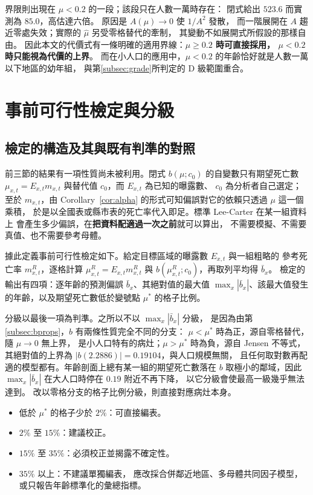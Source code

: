 \documentclass[UTF8, fontset=macnew, a4paper, 12pt]{ctexart}
\begin{document}
界限則出現在 $\mu<0.2$ 的一段；該段只在人數一萬時存在：
閉式給出 $523.6$ 而實測為 $85.0$，高估達六倍。
原因是 $A(\mu)\to0$ 使 $1/A^2$ 發散，
而一階展開在 $A$ 趨近零處失效；實際的 $\hat\mu$ 另受零格替代的牽制，
其變動不如展開式所假設的那樣自由。
因此本文的代價式有一條明確的適用界線：\textbf{$\mu\ge0.2$ 時可直接採用，
$\mu<0.2$ 時只能視為代價的上界}。
而在小人口的應用中，$\mu<0.2$ 的年齡恰好就是人數一萬以下地區的幼年組，
與第\ref{subsec:grade}所判定的 D 級範圍重合。

\section{事前可行性檢定與分級}\label{sec:feas}

\subsection{檢定的構造及其與既有判準的對照}\label{subsec:feasconstr}\label{subsec:cred2}

前三節的結果有一項性質尚未被利用。閉式 $b(\mu;c_0)$ 的自變數只有期望死亡數
$\mu_{x,t}=E_{x,t}m_{x,t}$ 與替代值 $c_0$，而 $E_{x,t}$ 為已知的曝露數、
$c_0$ 為分析者自己選定；至於 $m_{x,t}$，由 Corollary~\ref{cor:alpha}
的形式可知偏誤對它的依賴只透過 $\mu$ 這一個乘積，
於是以全國表或縣市表的死亡率代入即足。標準 Lee-Carter 在某一組資料上
會產生多少偏誤，在\textbf{把資料配適過一次之前}就可以算出，
不需要模擬、不需要真值、也不需要參考母體。

據此定義事前可行性檢定如下。給定目標區域的曝露數 $E_{x,t}$ 與一組粗略的
參考死亡率 $m^{R}_{x,t}$，逐格計算 $\mu^{R}_{x,t}=E_{x,t}m^{R}_{x,t}$ 與
$b(\mu^{R}_{x,t};c_0)$，再取列平均得 $\bar b_x$。
檢定的輸出有四項：逐年齡的預測偏誤 $\bar b_x$、其絕對值的最大值
$\max_x|\bar b_x|$、該最大值發生的年齡，以及期望死亡數低於變號點
$\mu^{\ast}$ 的格子比例。

分級以最後一項為判準。之所以不以 $\max_x|\bar b_x|$ 分級，
是因為由第\ref{subsec:bprops}，$b$ 有兩條性質完全不同的分支：
$\mu<\mu^{\ast}$ 時為正，源自零格替代，隨 $\mu\to0$ 無上界，
是小人口特有的病灶；$\mu>\mu^{\ast}$ 時為負，源自 Jensen 不等式，
其絕對值的上界為 $|b(2.2886)|=0.19104$，與人口規模無關，
且任何取對數再配適的模型都有。年齡剖面上總有某一組的期望死亡數落在
$b$ 取極小的鄰域，因此 $\max_x|\bar b_x|$ 在大人口時停在 $0.19$ 附近不再下降，
以它分級會使最高一級幾乎無法達到。
改以零格分支的格子比例分級，則直接對應病灶本身。

\begin{itemize}[leftmargin=2.4em]
  \item[\textbf{A}] 低於 $\mu^{\ast}$ 的格子少於 $2\%$：可直接編表。
  \item[\textbf{B}] $2\%$ 至 $15\%$：建議校正。
  \item[\textbf{C}] $15\%$ 至 $35\%$：必須校正並揭露不確定性。
  \item[\textbf{D}] $35\%$ 以上：不建議單獨編表，
        應改採合併鄰近地區、多母體共同因子模型，或只報告年齡標準化的彙總指標。
\end{itemize}
\end{document}
